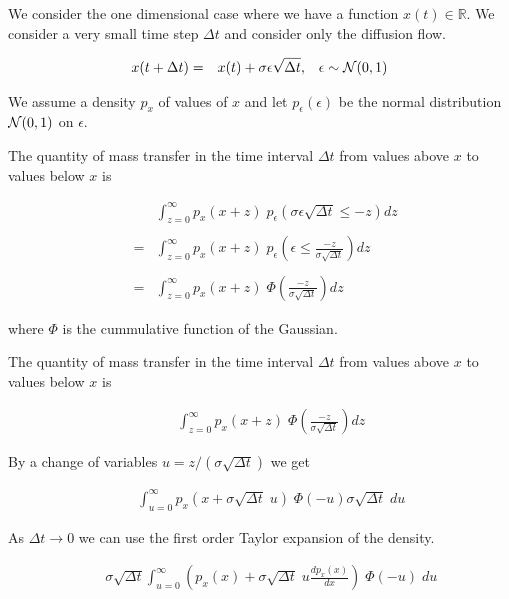 {{\Large
We consider the one dimensional case where we have a function $x(t) \in \mathbb{R}$.  We consider a very small time step $\Delta t$ and consider only the diffusion flow.

\begin{eqnarray*}
x(t + \Delta t) & = & x(t) + \sigma \epsilon \sqrt{\Delta t},\;\;\;\epsilon \sim {\cal N}(0,1)
\end{eqnarray*}

\vfill
We assume a density $p_x$ of values of $x$ and let $p_\epsilon(\epsilon)$ be the normal distribution ${\cal N}(0,1)$ on $\epsilon$.

\vfill
The quantity of mass transfer in the time interval $\Delta t$ from values above $x$ to values below $x$ is

\begin{eqnarray*}
& & \int_{z = 0}^\infty  p_x(x + z)\;p_\epsilon(\sigma\epsilon\sqrt{\Delta t} \leq -z) dz  \\
\\
& = & \int_{z = 0}^\infty  p_x(x + z)\;p_\epsilon\left(\epsilon \leq \frac{-z}{\sigma\sqrt{\Delta t}}\right) dz  \\
\\
& =  & \int_{z = 0}^\infty p_x(x+z)\;\Phi\left(\frac{-z}{\sigma\sqrt{\Delta t}}\right) dz
\end{eqnarray*}

\vfill
where $\Phi$ is the cummulative function of the Gaussian.
}

{\Large

The quantity of mass transfer in the time interval $\Delta t$ from values above $x$ to values below $x$ is


\begin{eqnarray*}
&  & \int_{z = 0}^\infty p_x(x+z)\;\Phi\left(\frac{-z}{\sigma\sqrt{\Delta t}}\right) dz
\end{eqnarray*}

By a change of variables $u = z/(\sigma\sqrt{\Delta t})$ we get

\begin{eqnarray*}
&  & \int_{u = 0}^\infty p_x(x+\sigma\sqrt{\Delta t}\;u)\;\Phi(-u) \sigma\sqrt{\Delta t}\;du
\end{eqnarray*}

\vfill
As $\Delta t \rightarrow 0$ we can use the first order Taylor expansion of the density.

\begin{eqnarray*}
&  & \sigma\sqrt{\Delta t} \int_{u = 0}^\infty \left(p_x(x)+\sigma\sqrt{\Delta t}\;u \frac{dp_x(x)}{dx}\right)\;\Phi(-u)\;du
\end{eqnarray*}
}

}
